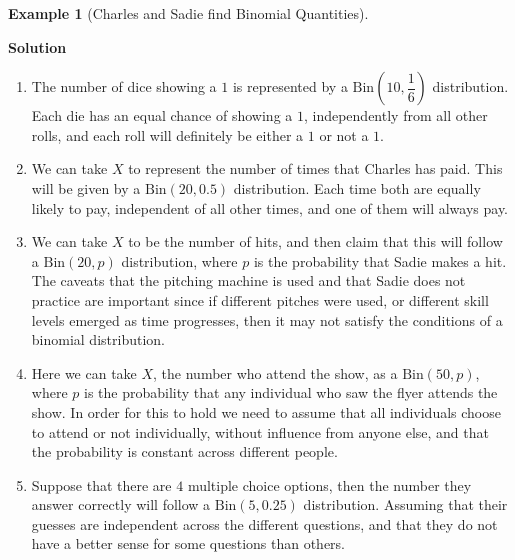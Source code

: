 \documentclass[
  letterpaper,
  DIV=11,
  numbers=noendperiod]{scrreprt}
\providecommand{\tightlist}{%
  \setlength{\itemsep}{0pt}\setlength{\parskip}{0pt}}\usepackage{longtable,booktabs,array}
\theoremstyle{definition}
\theoremstyle{definition}
\newtheorem{example}{Example}[chapter]
\theoremstyle{definition}
\theoremstyle{remark}
\begin{document}
\begin{example}[Charles and Sadie find Binomial
Quantities]
\begin{tcolorbox}[enhanced jigsaw, colback=white, colframe=quarto-callout-color-frame, arc=.35mm, leftrule=.75mm, rightrule=.15mm, opacityback=0, breakable, bottomrule=.15mm, left=2mm, toprule=.15mm]

\vspace{-3mm}\textbf{Solution}\vspace{3mm}

\begin{enumerate}
\def\labelenumi{\alph{enumi}.}
\tightlist
\item
  The number of dice showing a \(1\) is represented by a
  \(\text{Bin}(10, \dfrac{1}{6})\) distribution. Each die has an equal
  chance of showing a \(1\), independently from all other rolls, and
  each roll will definitely be either a \(1\) or not a \(1\).
\item
  We can take \(X\) to represent the number of times that Charles has
  paid. This will be given by a \(\text{Bin}(20, 0.5)\) distribution.
  Each time both are equally likely to pay, independent of all other
  times, and one of them will always pay.
\item
  We can take \(X\) to be the number of hits, and then claim that this
  will follow a \(\text{Bin}(20, p)\) distribution, where \(p\) is the
  probability that Sadie makes a hit. The caveats that the pitching
  machine is used and that Sadie does not practice are important since
  if different pitches were used, or different skill levels emerged as
  time progresses, then it may not satisfy the conditions of a binomial
  distribution.
\item
  Here we can take \(X\), the number who attend the show, as a
  \(\text{Bin}(50,p)\), where \(p\) is the probability that any
  individual who saw the flyer attends the show. In order for this to
  hold we need to assume that all individuals choose to attend or not
  individually, without influence from anyone else, and that the
  probability is constant across different people.
\item
  Suppose that there are \(4\) multiple choice options, then the number
  they answer correctly will follow a \(\text{Bin}(5,0.25)\)
  distribution. Assuming that their guesses are independent across the
  different questions, and that they do not have a better sense for some
  questions than others.
\end{enumerate}

\end{tcolorbox}

\end{example}
\end{document}
